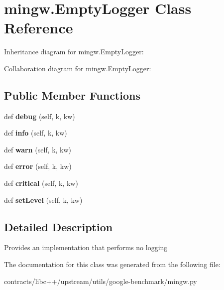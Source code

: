 \hypertarget{classmingw_1_1_empty_logger}{}\section{mingw.\+Empty\+Logger Class Reference}
\label{classmingw_1_1_empty_logger}


Inheritance diagram for mingw.\+Empty\+Logger\+:


Collaboration diagram for mingw.\+Empty\+Logger\+:
\subsection*{Public Member Functions}
\begin{DoxyCompactItemize}
\item 
\mbox{\label{classmingw_1_1_empty_logger_a5b6f21232e6869099b5750d538051dc2}} 
def {\bfseries debug} (self, k, kw)
\item 
\mbox{\label{classmingw_1_1_empty_logger_a93caac1cb957d43994e3495fb505de59}} 
def {\bfseries info} (self, k, kw)
\item 
\mbox{\label{classmingw_1_1_empty_logger_a8b43dcdd7b7c089ced1471ea9fc7f27e}} 
def {\bfseries warn} (self, k, kw)
\item 
\mbox{\label{classmingw_1_1_empty_logger_a8b394e52ceda4a3854ba0e91bfd9a3ce}} 
def {\bfseries error} (self, k, kw)
\item 
\mbox{\label{classmingw_1_1_empty_logger_a88f5f0f64c941147b7e9bbc6d4a93b30}} 
def {\bfseries critical} (self, k, kw)
\item 
\mbox{\label{classmingw_1_1_empty_logger_ad1b13e14ac682d768de5a599e6465a32}} 
def {\bfseries set\+Level} (self, k, kw)
\end{DoxyCompactItemize}


\subsection{Detailed Description}
\begin{DoxyVerb}Provides an implementation that performs no logging
\end{DoxyVerb}
 

The documentation for this class was generated from the following file\+:\begin{DoxyCompactItemize}
\item 
contracts/libc++/upstream/utils/google-\/benchmark/mingw.\+py\end{DoxyCompactItemize}
